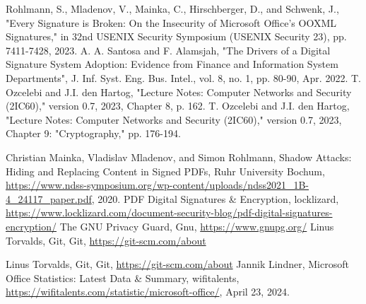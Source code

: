 \documentclass[conference]{IEEEtran}
\begin{document}
    \begin{thebibliography}{00}
         Rohlmann, S., Mladenov, V., Mainka, C., Hirschberger, D., and Schwenk, J., "Every Signature is Broken: On the Insecurity of Microsoft {Office’s} {OOXML} Signatures," in 32nd USENIX Security Symposium (USENIX Security 23), pp. 7411-7428, 2023.
         A. A. Santosa and F. Alamsjah, "The Drivers of a Digital Signature System Adoption: Evidence from Finance and Information System Departments", J. Inf. Syst. Eng. Bus. Intel., vol. 8, no. 1, pp. 80-90, Apr. 2022.
         T. Ozcelebi and J.I. den Hartog, "Lecture Notes: Computer Networks and Security (2IC60)," version 0.7, 2023, Chapter 8, p. 162.
         T. Ozcelebi and J.I. den Hartog, "Lecture Notes: Computer Networks and Security (2IC60)," version 0.7, 2023, Chapter 9: "Cryptography," pp. 176-194.
        
         Christian Mainka, Vladislav Mladenov, and Simon Rohlmann, Shadow Attacks: Hiding and Replacing Content in Signed PDFs, Ruhr University Bochum, \url{https://www.ndss-symposium.org/wp-content/uploads/ndss2021_1B-4_24117_paper.pdf}, 2020.
         PDF Digital Signatures \& Encryption, locklizard, \url{https://www.locklizard.com/document-security-blog/pdf-digital-signatures-encryption/}
         The GNU Privacy Guard, Gnu, \url{https://www.gnupg.org/}
         Linus Torvalds, Git, Git, \url{https://git-scm.com/about}

         Linus Torvalds, Git, Git, \url{https://git-scm.com/about}
         Jannik Lindner, Microsoft Office Statistics: Latest Data \& Summary, wifitalents, \url{https://wifitalents.com/statistic/microsoft-office/},  April 23, 2024.

    \end{thebibliography}
\end{document}
